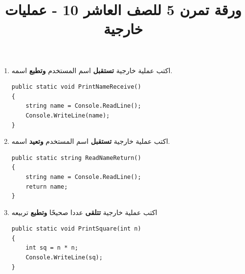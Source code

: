 ﻿\documentclass[12pt]{article}
\title{ورقة تمرن 5 للصف العاشر 10 - عمليات خارجية}
\begin{document}
\maketitle
\thispagestyle{fancy}

\ifwithsols
\begin{enumerate}[itemsep=3em]
\else
\begin{enumerate}
\fi



\begin{boxAttention}
عندما يٌطلب "عملية خارجية \textbf{تستقبل}" يجب ان يكون المستخدم يدخل قيمة للمتغير. أي عليك استعمال \texttt{Console.ReadLine()}. \\


أما عندما يُطلب منك "عملية خارجية \textbf{تتلقى}" فهذا يعني أنّها تتلقى المطلوب كبارمترات.
\end{boxAttention}

\item اكتب عملية خارجية \textbf{تستقبل} اسم المستخدم \textbf{وتطبع} اسمه.
\ifwithsols
\begin{boxSolution}
\begin{english}
\begin{verbatim}
public static void PrintNameReceive()
{
    string name = Console.ReadLine();
    Console.WriteLine(name);
}
\end{verbatim}
\end{english}
\end{boxSolution}
\fi


\item اكتب عملية خارجية \textbf{تستقبل} اسم المستخدم \textbf{وتعيد} اسمه.
\ifwithsols
\begin{boxSolution}
\begin{english}
\begin{verbatim}
public static string ReadNameReturn()
{
    string name = Console.ReadLine();
    return name;
}
\end{verbatim}
\end{english}
\end{boxSolution}
\fi


\item اكتب عملية خارجية \textbf{تتلقى} عددا صحيحًا \textbf{وتطبع} تربيعه
\ifwithsols
\begin{boxSolution}
\begin{english}
\begin{verbatim}
public static void PrintSquare(int n)
{
    int sq = n * n;
    Console.WriteLine(sq);
}
\end{verbatim}
\end{english}
\end{boxSolution}
\fi



\end{enumerate}
\end{enumerate}
\end{document}

